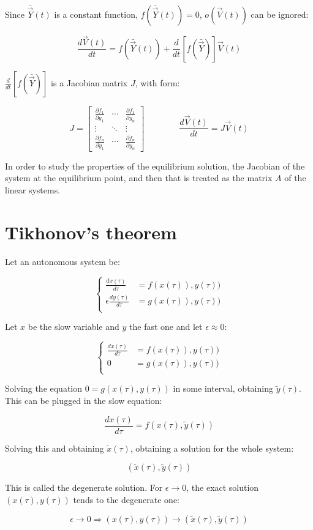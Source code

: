   Since $\bar{\vec{Y}}(t)$ is a constant function, $f(\bar{\vec{Y}}(t)) = 0$, $o(\vec{V}(t))$ can be ignored:

  $$\frac{d\vec{V}(t)}{dt} = f(\bar{\vec{Y}}(t)) + \frac{d}{dt}\left[f(\bar{\vec{Y}})\right]\vec{V}(t)$$

  $\frac{d}{dt}\left[f(\bar{\vec{Y}})\right]$ is a Jacobian matrix $J$, with form:

  $$J = \begin{bmatrix} \frac{\partial f_1}{\partial y_1} & \cdots & \frac{\partial f_1}{\partial y_n}\\\vdots & \ddots & \vdots\\\frac{\partial f_n}{\partial y_1} & \cdots & \frac{\partial f_n}{\partial y_n}\end{bmatrix}\qquad\qquad \frac{d\vec{V}(t)}{dt} = J\vec{V}(t)$$

  In order to study the properties of the equilibrium solution, the Jacobian of the system at the equilibrium point, and then that is treated as the matrix $A$ of the linear systems.

\section{Tikhonov's theorem}
Let an autonomous system be:

$$\begin{cases}
  \frac{dx(\tau)}{d\tau} &= f(x(\tau)), y(\tau))\\
  \epsilon\frac{dy(\tau)}{d\tau} &= g(x(\tau)), y(\tau))\\
\end{cases}$$

Let $x$ be the slow variable and $y$ the fast one and let $\epsilon\approx 0$:

$$\begin{cases}
  \frac{dx(\tau)}{d\tau} &= f(x(\tau)), y(\tau))\\
  0 &= g(x(\tau)), y(\tau))\\
\end{cases}$$

Solving the equation $0 = g(x(\tau), y(\tau))$ in some interval, obtaining $\tilde{y}(\tau)$.
This can be plugged in the slow equation:

$$\frac{dx(\tau)}{d\tau} = f(x(\tau), \tilde{y}(\tau))$$

Solving this and obtaining $\tilde{x}(\tau)$, obtaining a solution for the whole system:

$$(\tilde{x}(\tau), \tilde{y}(\tau))$$

This is called the degenerate solution.
For $\epsilon\to 0$, the exact solution $(x(\tau), y(\tau))$ tends to the degenerate one:

$$\epsilon\to0\Rightarrow (x(\tau), y(\tau))\to(\tilde{x}(\tau), \tilde{y}(\tau))$$





















